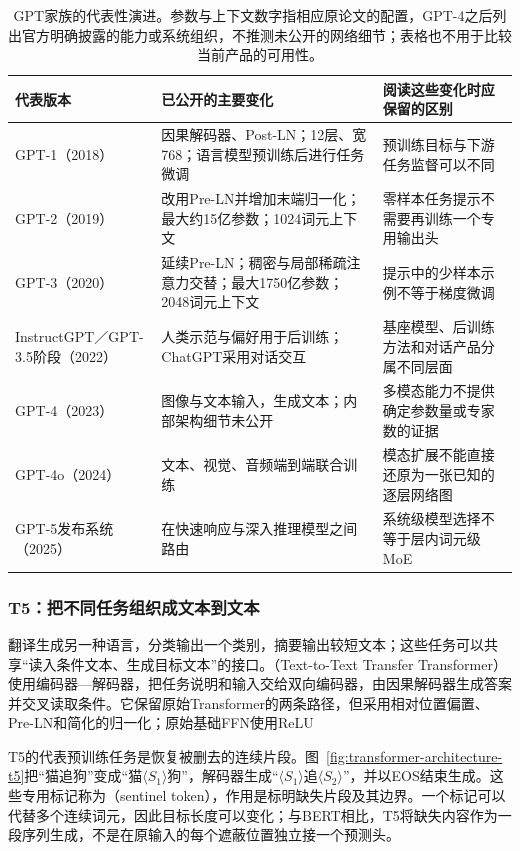 \begin{table}[p]
  \centering
  \small
  \begin{tabular}{@{}p{25mm}p{64mm}p{66mm}@{}}
    \toprule
    代表版本 & 已公开的主要变化 & 阅读这些变化时应保留的区别 \\
    \midrule
    GPT-1（2018） & 因果解码器、Post-LN；12层、宽768；语言模型预训练后进行任务微调 & 预训练目标与下游任务监督可以不同 \\
    GPT-2（2019） & 改用Pre-LN并增加末端归一化；最大约15亿参数；1024词元上下文 & 零样本任务提示不需要再训练一个专用输出头 \\
    GPT-3（2020） & 延续Pre-LN；稠密与局部稀疏注意力交替；最大1750亿参数；2048词元上下文 & 提示中的少样本示例不等于梯度微调 \\
    InstructGPT／GPT-3.5阶段（2022） & 人类示范与偏好用于后训练；ChatGPT采用对话交互 & 基座模型、后训练方法和对话产品分属不同层面 \\
    GPT-4（2023） & 图像与文本输入，生成文本；内部架构细节未公开 & 多模态能力不提供确定参数量或专家数的证据 \\
    GPT-4o（2024） & 文本、视觉、音频端到端联合训练 & 模态扩展不能直接还原为一张已知的逐层网络图 \\
    GPT-5发布系统（2025） & 在快速响应与深入推理模型之间路由 & 系统级模型选择不等于层内词元级MoE \\
    \bottomrule
  \end{tabular}
  \caption{GPT家族的代表性演进。参数与上下文数字指相应原论文的配置，GPT-4之后列出官方明确披露的能力或系统组织，不推测未公开的网络细节；表格也不用于比较当前产品的可用性。}
  \label{tab:transformer-gpt-generations}
\end{table}
\FloatBarrier

\subsubsection{T5：把不同任务组织成文本到文本}

翻译生成另一种语言，分类输出一个类别，摘要输出较短文本；这些任务可以共享“读入条件文本、生成目标文本”的接口。（Text-to-Text Transfer Transformer）使用编码器—解码器，把任务说明和输入交给双向编码器，由因果解码器生成答案并交叉读取条件。它保留原始Transformer的两条路径，但采用相对位置偏置、Pre-LN和简化的归一化；原始基础FFN使用ReLU

T5的代表预训练任务是恢复被删去的连续片段。图~\ref{fig:transformer-architecture-t5}把“猫追狗”变成“猫$\langle S_1\rangle$狗”，解码器生成“$\langle S_1\rangle$追$\langle S_2\rangle$”，并以EOS结束生成。这些专用标记称为（sentinel token），作用是标明缺失片段及其边界。一个标记可以代替多个连续词元，因此目标长度可以变化；与BERT相比，T5将缺失内容作为一段序列生成，不是在原输入的每个遮蔽位置独立接一个预测头。

